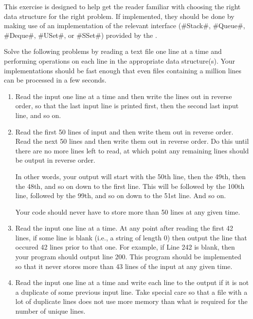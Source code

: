 \begin{exc}
  This exercise is designed to help get the reader familiar with choosing
  the right data structure for the right problem.  If implemented, they
  should be done by making use of an implementation of the relevant
  interface (#Stack#, #Queue#, #Deque#, #USet#, or #SSet#) provided
  by the .

  Solve the following problems by reading a text file one line at a
  time and performing operations on each line in the appropriate data
  structure(s).  Your implementations should be fast enough that even
  files containing a million lines can be processed in a few seconds.
  \begin{enumerate}
    \item Read the input one line at a time and then write the lines out
      in reverse order, so that the last input line is printed first,
      then the second last input line, and so on.

    \item  Read the first 50 lines of input and then write them out in
      reverse order. Read the next 50 lines and then write them out in
      reverse order. Do this until there are no more lines left to read,
      at which point any remaining lines should be output in reverse
      order.

      In other words, your output will start with the 50th line, then
      the 49th, then the 48th, and so on down to the first line. This
      will be followed by the 100th line, followed by the 99th, and so
      on down to the 51st line. And so on.
      
      Your code should never have to store more than 50 lines at any
      given time.

    \item Read the input one line at a time.
      At any point after reading the first 42 lines, if some line is blank
      (i.e., a string of length 0) then output the line that occured
      42 lines prior to that one. For example, if Line 242 is blank,
      then your program should output line 200. This program should
      be implemented so that it never stores more than 43 lines of the
      input at any given time.

    \item Read the input one line at a time and write each line to the
      output if it is not a duplicate of some previous input line. Take
      special care so that a file with a lot of duplicate lines does not
      use more memory than what is required for the number of unique lines.


\end{enumerate}
\end{exc}
